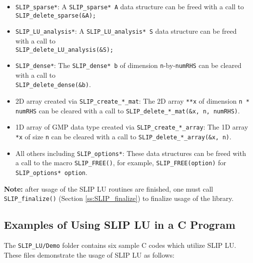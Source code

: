 \documentclass[12pt]{article}
\theoremstyle{definition}
\begin{document}
\begin{itemize}
\item \verb|SLIP_sparse*|: A \verb|SLIP_sparse* A| data structure can be freed
with a call to \verb|SLIP_delete_sparse(&A);|

\item \verb|SLIP_LU_analysis*|: A \verb|SLIP_LU_analysis* S| data structure can
be freed with a call to\\ \verb|SLIP_delete_LU_analysis(&S);|

\item \verb|SLIP_dense*|: The \verb|SLIP_dense* b| of dimension
\verb|n|-by-\verb|numRHS| can be cleared with a call to \\
\verb|SLIP_delete_dense(&b)|.

\item 2D array created via \verb|SLIP_create_*_mat|: The 2D array \verb|**x| of
dimension \verb|n * numRHS| can be cleared with a call to
\verb|SLIP_delete_*_mat(&x, n, numRHS)|.

\item 1D array of GMP data type created via \verb|SLIP_create_*_array|: The 1D
array \verb|*x| of size \verb|n| can be cleared with a call to
\verb|SLIP_delete_*_array(&x, n)|.

\item All others including \verb|SLIP_options*|: These data structures can be
freed with a call to the macro \verb|SLIP_FREE()|, for example,
\verb|SLIP_FREE(option)| for \verb|SLIP_options* option|.

\end{itemize}

\textbf{Note:} after usage of the SLIP LU routines are finished, one must call
\verb|SLIP_finalize()| (Section \ref{ss:SLIP_finalize}) to finalize usage of
the library.

\cprotect\subsection{Examples of Using SLIP LU in a C Program}
\label{s:Using:Examples}

The \verb|SLIP_LU/Demo| folder contains six sample C codes which utilize SLIP
LU. These files demonstrate the usage of SLIP LU as follows:
\end{document}
